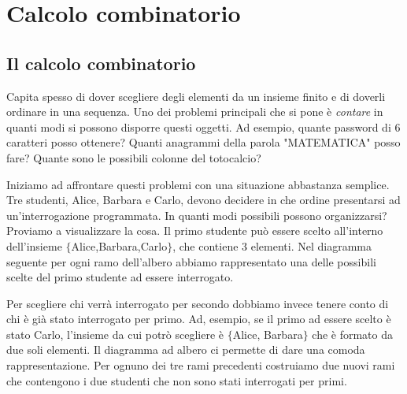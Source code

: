 
\chapter{Calcolo combinatorio}

\section{Il calcolo combinatorio}
\label{sec:01_introduzione}
Capita spesso di dover scegliere degli elementi da un insieme finito e di 
doverli ordinare in una sequenza. Uno dei problemi principali che si pone è 
\emph{contare} in quanti modi si possono disporre questi oggetti. Ad esempio, 
quante password di 6 caratteri posso ottenere? Quanti anagrammi della parola 
"MATEMATICA" posso fare? Quante sono le possibili colonne del totocalcio?

\vspace{7pt}

Iniziamo ad affrontare questi problemi con una situazione abbastanza semplice. 
Tre studenti, Alice, Barbara e Carlo, devono decidere in che ordine presentarsi 
ad un'interrogazione programmata.
In quanti modi possibili possono organizzarsi?
Proviamo a visualizzare la cosa. Il primo studente può essere scelto 
all'interno dell'insieme \(\{\)Alice,Barbara,Carlo\(\}\), che contiene 3 elementi. Nel 
diagramma seguente per ogni ramo dell'albero abbiamo rappresentato una delle 
possibili scelte del primo studente ad essere interrogato.

\vspace{-6pt}
\begin{center}
\end{center}

\vspace{-6pt}
Per scegliere chi verrà interrogato per secondo dobbiamo invece tenere conto di 
chi è già stato interrogato per primo. Ad, esempio, se il primo ad essere 
scelto è stato Carlo, l'insieme da cui potrò scegliere è \(\{\)Alice, Barbara\(\}\) 
che è formato da due soli elementi. Il diagramma ad albero ci permette di dare 
una comoda rappresentazione. Per ognuno dei tre rami precedenti costruiamo due 
nuovi rami che contengono i due studenti che non sono stati interrogati per 
primi.


